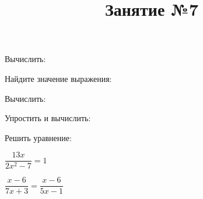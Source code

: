 \begin{listofex}
\begin{enumcols}[itemcolumns=3]
	\end{enumcols}
	\item Вычислить:
	\begin{enumcols}[itemcolumns=2]
		\item {}
		\item {}
	\end{enumcols}
	\item Найдите значение выражения:
	\begin{enumcols}[itemcolumns=2]
		\item {}
		\item {}
		\item {}
	\end{enumcols}
\end{listofex}
\newpage
\title{Занятие №7}
\begin{listofex}
	\item Вычислить:
	\begin{enumcols}[itemcolumns=2]
		\item {}
		\item {}
		\item {}
		\item {}
		\item {}
		\item {}
	\end{enumcols}
	\item {}
	\item Упростить и вычислить:
	\begin{enumcols}[itemcolumns=2]
		\item {}
		\item {}
	\end{enumcols}
	\item {}
	\item {}
	\item {}
	\item Решить уравнение:
	\begin{enumcols}[itemcolumns=2]
		\item \( \dfrac{13x}{2x^2-7}=1 \) 
		\item \( \dfrac{x-6}{7x+3}=\dfrac{x-6}{5x-1} \) 
		\item {}
		\item {}
	\end{enumcols}

\end{listofex}
